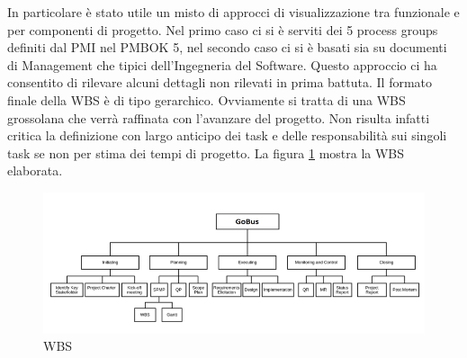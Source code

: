 In particolare \`{e} stato utile un misto di approcci di visualizzazione tra funzionale e per componenti di progetto. Nel primo caso ci si \`{e} serviti dei 5 process groups definiti dal PMI nel PMBOK 5, nel secondo caso ci si \`{e} basati sia su documenti di Management che tipici dell\rq Ingegneria del Software.
Questo approccio ci ha consentito di rilevare alcuni dettagli non rilevati in prima battuta. 
Il formato finale della WBS \`{e} di tipo gerarchico. Ovviamente si tratta di una WBS grossolana che verr\`{a} raffinata con l\rq avanzare del progetto. Non risulta infatti critica la definizione con largo anticipo dei task e delle responsabilit\`{a} sui singoli task se non per stima dei tempi di progetto.
La figura \ref{fig:wbs} mostra la WBS elaborata.

\begin{figure}[tp]
\centering
\includegraphics[scale=.6]{img/6.png}
\caption{WBS}
\label{fig:wbs}
\end{figure}

